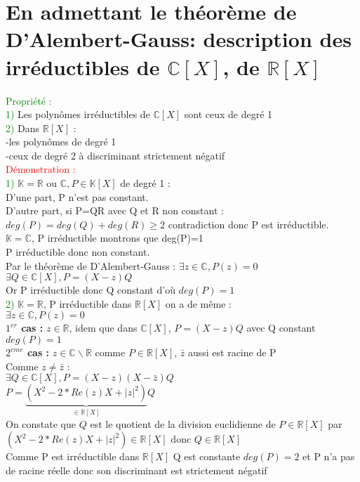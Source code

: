 \documentclass{article}
\begin{document}
\section{En admettant  le théorème de D'Alembert-Gauss: description des irréductibles de $\mathbb C [X]$, de $\mathbb R[X]$}
\textcolor{green}{Propriété :} \\
\textcolor{green}{1)} Les polynômes irréductibles de $\mathbb C [X]$ sont ceux de degré 1 \\
\textcolor{green}{2)} Dans $\mathbb R [X]$ : \\
 \indent -les polynômes de degré 1 \\
 \indent -ceux de degré 2 à discriminant strictement négatif \\
 \textcolor{red}{Démonstration :} \\
\textcolor{green}{1)} $\mathbb  K = \mathbb{R}$ ou $\mathbb{C}, P \in \mathbb K[X]$ de degré 1 : \\
D'une part, P n'est pas constant. \\
D'autre part, si P=QR avec Q et R non constant : \\
$deg(P)=deg(Q)+deg(R) \geq 2$ contradiction donc P est irréductible. \\
$\mathbb{K}= \mathbb C$, P irréductible montrons que deg(P)=1 \\
P irréductible donc non constant. \\
Par le théorème de D'Alembert-Gauss : $\exists z \in \mathbb C, P(z)=0$ \\
$\exists Q \in \mathbb C [X], P=(X-z)Q$ \\
Or P irréductible donc Q constant d'où $deg(P)=1$ \\
\textcolor{green}{2)} $\mathbb K= \mathbb R$, P irréductible dans $ \mathbb R [X]$ on a de  même : \\
$\exists z \in \mathbb C, P(z)=0$ \\
{\bf \boldmath $1^{er}$ cas :} $z\in \mathbb R$, idem que dans $\mathbb C[X]$, $P=(X-z)Q$ avec Q constant $deg(P)=1$ \\
{\bf \boldmath $2^{eme}$ cas :} $z \in \mathbb C \backslash \mathbb R $ comme $P \in \mathbb R [X]$, $\bar{z}$ aussi est racine de P \\
Comme $z \neq \bar{z}$ : \\
$\exists Q \in \mathbb C [X],P=(X-z)(X-\bar{z})Q$ \\
$P=\underbrace{(X^2-2*Re(z)X+|z|^2)}_{\in \mathbb R [X]}Q$ \\
On constate que $Q$ est le quotient de la division euclidienne de $P \in \mathbb{R}[X]$ par $(X^2-2*Re(z)X+|z|^2) \in \mathbb R [X]$ donc $Q \in \mathbb{R}[X]$ \\
Comme P est irréductible dans $\mathbb{R}[X]$ Q est constante $deg(P)=2$ et P n'a pas de racine réelle donc son discriminant est strictement négatif
\end{document}
